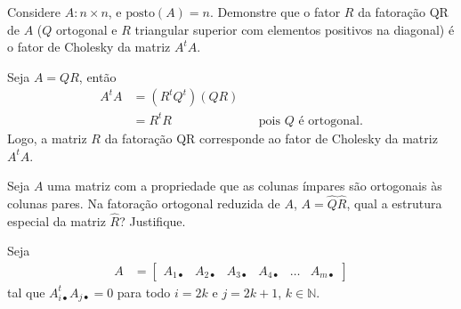 \documentclass[a4paper,12pt, leqno, answers]{exam}
\newcommand{\mdot}{\bullet}
\begin{document}
\begin{questions}
\begin{parts}
\begin{solution}
\begin{center}
            \end{center}
        \end{solution}
    \end{parts}

    \question Considere $A : n \times n$, e $\text{posto}(A) = n$. Demonstre que o fator $R$ da fatora\c{c}\~{a}o QR de $A$ ($Q$ ortogonal e $R$ triangular superior com elementos positivos na diagonal) \'{e} o fator de Cholesky da matriz $A^t A$.
    \begin{solution}
        Seja $A = Q R$, ent\~{a}o
        \begin{align*}
            A^t A &= \left( R^t Q^t \right) \left( Q R \right) \\
            &= R^t R && \text{pois $Q$ \'{e} ortogonal}.
        \end{align*}
        Logo, a matriz $R$ da fatora\c{c}\~{a}o QR corresponde ao fator de Cholesky da matriz $A^t A$.
    \end{solution}

    \question Seja $A$ uma matriz com a propriedade que as colunas \'{i}mpares s\~{a}o ortogonais \`{a}s colunas pares. Na fatora\c{c}\~{a}o ortogonal reduzida de $A$, $A = \hat{Q} \hat{R}$, qual a estrutura especial da matriz $\hat{R}$? Justifique.
    \begin{solution}
        Seja
        \begin{align*}
            A &= \begin{bmatrix}
                A_{1 \mdot} & A_{2 \mdot} & A_{3 \mdot} & A_{4 \mdot} & \ldots & A_{m \mdot}
            \end{bmatrix}
        \end{align*}
        tal que $A_{i \mdot}^t A_{j \mdot} = 0$ para todo $i = 2k$ e $j = 2k + 1$, $k \in \mathbb{N}$.


\end{solution}
\end{questions}
\end{document}

